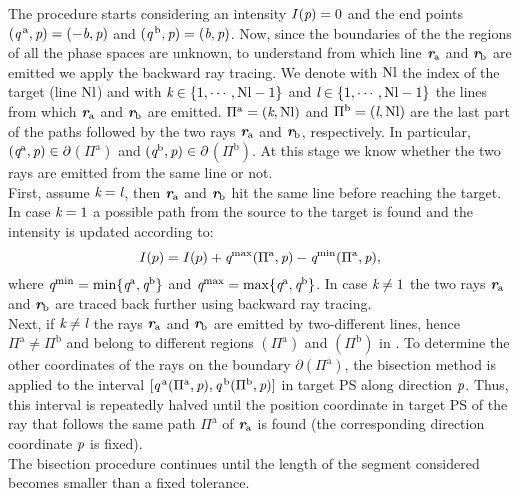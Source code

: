 The procedure starts considering an intensity $I(\textit{p})=0$ and the end points $(\textit{q}^{\,\textrm{a}}, \textit{p})= (-\textit{b}, \textit{p})$ and $(\textit{q}^{\,\textrm{b}}, \textit{p}) = (\textit{b}, \textit{p})$. Now, since the boundaries of the the regions of all the phase spaces are unknown, to understand from which line $\textit{\textbf{r}}_{\textrm{a}}$ and $\textit{\textbf{r}}_{\textrm{b}}$ are emitted we apply the backward ray tracing. We denote with $\textrm{Nl}$ the index of the target (line $\textrm{Nl}$) and with $\textit{k}\in\{1,\cdots, \textrm{Nl}-1\}$ and $\textit{l}\in\{1,\cdots, \textrm{Nl}-1\}$ the lines from which $\textit{\textbf{r}}_{\textrm{a}}$ and $\textit{\textbf{r}}_{\textrm{b}}$ are emitted. $\Pi^\textrm{a} = (\textit{k}, \textrm{Nl})$ and $\Pi^\textrm{b} = (\textit{l},\textrm{Nl})$ are the last part of the paths followed by the two rays $\textit{\textbf{r}}_{\textrm{a}}$ and $\textit{\textbf{r}}_{\textrm{b}}$, respectively. In particular, $(\textit{q}^{\textrm{a}}, \textit{p})\in\partial$$(\Pi^{\textrm{a}})$ and $(\textit{q}^{\textrm{b}}, \textit{p})\in\partial$$(\Pi^{\textrm{b}})$. At this stage we know whether the two rays are emitted from the same line or not. \\ \indent 
First, assume $\textit{k}= \textit{l}$, then $\textit{\textbf{r}}_{\textrm{a}}$ and $\textit{\textbf{r}}_{\textrm{b}}$ hit the same line before reaching the target. 
In case $\textit{k} = 1$ a possible path from the source to the target is found and the intensity is updated according to:
\begin{equation}
I(p) = I(p)+\textit{q}^{\textrm{max}}(\Pi^\textrm{a}, \textit{p})-\textit{q}^{\textrm{min}}(\Pi^\textrm{a}, \textit{p}),
\end{equation}
where $\textit{q}^{\textrm{min}} = \min\{\textit{q}^{\textrm{a}}, \textit{q}^{\textrm{b}}\}$ and $\textit{q}^{\textrm{max}} = \max\{\textit{q}^{\textrm{a}}, \textit{q}^{\textrm{b}}\}$. In case $\textit{k}\neq1$ the two rays $\textit{\textbf{r}}_{\textrm{a}}$ and $\textit{\textbf{r}}_{\textrm{b}}$ are traced back further using backward ray tracing.
\\ \indent Next, if $\textit{k}\neq \textit{l}$ the rays $\textit{\textbf{r}}_\textrm{a}$ and $\textit{\textbf{r}}_\textrm{b}$ are emitted by two-different lines, hence $\Pi^{\textrm{a}}\neq \Pi^{\textrm{b}}$ and belong to different regions $(\Pi^{\textrm{a}})$ and $(\Pi^{\textrm{b}})$ in . To determine the other coordinates of the rays on the boundary $\partial$$(\Pi^{\textrm{a}})$, the bisection method is applied to the interval $[\textit{q}^{\,\textrm{a}}(\Pi^{\textrm{a}}, \textit{p}), \textit{q}^{\,\textrm{b}}(\Pi^{\textrm{b}}, \textit{p})]$ in target PS  along direction $\textit{p}$. Thus, this interval is repeatedly halved until the position coordinate in target PS of the ray that follows the same path $\Pi^{\textrm{a}}$ of $\textit{\textbf{r}}_{\textrm{a}}$ is found (the corresponding direction coordinate $\textit{p}$ is fixed). \\ \indent The bisection procedure continues until the length of the segment considered becomes smaller than a fixed tolerance. 
